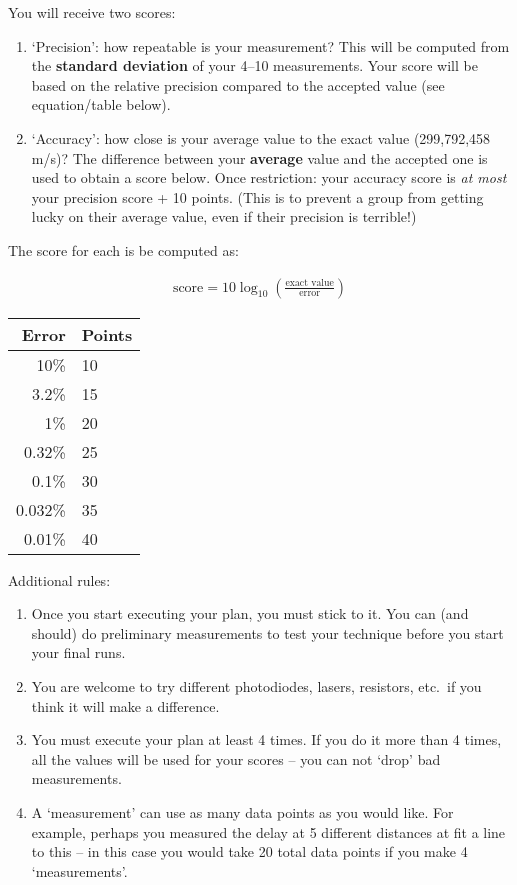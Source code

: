 \documentclass[12pt, letterpaper]{article}
\begin{document}
You will receive two scores:
\begin{enumerate}
	\item `Precision': how repeatable is your measurement?  This will be computed from the \textbf{standard deviation} of your 4--10 measurements.  Your score will be based on the relative precision compared to the accepted value (see equation/table below).
	\item `Accuracy': how close is your average value to the exact value (299,792,458 m/s)?  The difference between your \textbf{average} value and the accepted one is used to obtain a score below.  Once restriction: your accuracy score is \emph{at most} your precision score + 10 points.  (This is to prevent a group from getting lucky on their average value, even if their precision is terrible!)
\end{enumerate}

The score for each is be computed as:

\begin{centering}

\begin{align}
	\textrm{score} = 10 \log_{10} \left(\frac{\textrm{exact value}}{\textrm{error}}\right)
\end{align}

\begin{tabular}{r|l}
	\textbf{Error}&\textbf{Points}\\
	\hline
	10\% & 10\\
	3.2\% & 15\\
	1\% & 20\\
	0.32\% & 25\\
	0.1\% & 30\\
	0.032\% & 35\\
	0.01\% & 40
\end{tabular}

\end{centering}

Additional rules:
\begin{enumerate}
	\item Once you start executing your plan, you must stick to it.  You can (and should) do preliminary measurements to test your technique before you start your final runs.
	\item You are welcome to try different photodiodes, lasers, resistors, etc.~if you think it will make a difference.
	\item You must execute your plan at least 4 times.  If you do it more than 4 times, all the values will be used for your scores -- you can not `drop' bad measurements.
	\item A `measurement' can use as many data points as you would like.  For example, perhaps you measured the delay at 5 different distances at fit a line to this -- in this case you would take 20 total data points if you make 4 `measurements'.
\end{enumerate}
\end{document}
